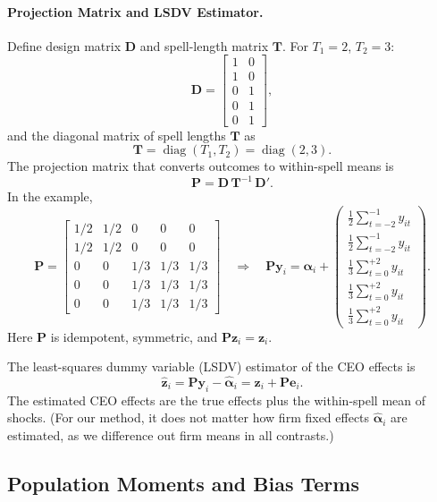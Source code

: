 \documentclass[11pt,a4paper]{article}
\begin{document}
\paragraph{Projection Matrix and LSDV Estimator.} Define design matrix $\mathbf D$ and spell-length matrix $\mathbf T$. For $T_1=2$, $T_2=3$:
\[
  \mathbf D = \begin{bmatrix}
    1 & 0\\
    1 & 0\\
    0 & 1\\
    0 & 1\\
    0 & 1
  \end{bmatrix},
\]
and the diagonal matrix of spell lengths $\mathbf T$ as
$$
  \mathbf T = \operatorname{diag}(T_1,T_2)=\operatorname{diag}(2,3).
$$
The projection matrix that converts outcomes to within-spell means is
$$
  \mathbf P = \mathbf D\,\mathbf T^{-1}\,\mathbf D'.
$$
In the example,
\[
  \mathbf P = \begin{bmatrix}
    1/2 & 1/2 & 0 & 0 & 0\\
    1/2 & 1/2 & 0 & 0 & 0\\
    0 & 0 & 1/3 & 1/3 & 1/3\\
    0 & 0 & 1/3 & 1/3 & 1/3\\
    0 & 0 & 1/3 & 1/3 & 1/3
  \end{bmatrix}\quad\Rightarrow\quad
  \mathbf {Py}_i = 
  \mathbf\alpha_i +
  \begin{pmatrix}
  \frac12 \sum_{t=-2}^{-1} y_{it} \\
  \frac12 \sum_{t=-2}^{-1} y_{it} \\
  \frac13 \sum_{t=0}^{+2} y_{it}\\
  \frac13 \sum_{t=0}^{+2} y_{it}\\
  \frac13 \sum_{t=0}^{+2} y_{it}
  \end{pmatrix}.
\]
Here $\mathbf P$ is idempotent, symmetric, and $\mathbf P\mathbf z_i = \mathbf z_i$.

The least-squares dummy variable (LSDV) estimator of the CEO effects is
\begin{equation}\label{eq:lsdv_appendix}
  \hat{\mathbf z}_i = \mathbf P\mathbf y_i - \hat{\mathbf \alpha}_i = \mathbf z_i + \mathbf P\mathbf e_i.
\end{equation}  
The estimated CEO effects are the true effects plus the within-spell mean of shocks. (For our method, it does not matter how firm fixed effects $\hat{\mathbf \alpha}_i$ are estimated, as we difference out firm means in all contrasts.)

\subsection{Population Moments and Bias Terms}
\end{document}
